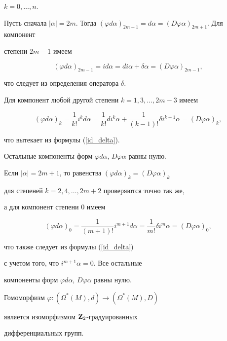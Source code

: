 $k=0,\dotsc,n$.





Пусть сначала $|\alpha|=2m$. Тогда $(\varphi d\alpha)_{2m+1}=


d\alpha=(D\varphi\alpha)_{2m+1}$. Для компонент


степени $2m-1$ имеем


$$


(\varphi d\alpha)_{2m-1}=id\alpha=di\alpha+\delta\alpha=


(D\varphi \alpha)_{2m-1},


$$


что следует из определения оператора $\delta$.





Для компонент любой другой степени $k=1,3,\dotsc,2m-3$ имеем


$$


(\varphi d\alpha)_k=\frac{1}{k!}i^k d\alpha=\frac{1}{k!}


di^k\alpha+\frac{1}{(k-1)!}\delta i^{k-1}\alpha=(D\varphi \alpha)_k,


$$


что вытекает из формулы (\ref{id_delta}).


Остальные компоненты форм $\varphi d\alpha$, $D\varphi\alpha$ равны нулю.





Если $|\alpha|=2m+1$, то равенства $(\varphi d\alpha)_k=(D\varphi\alpha)_k$


для степеней $k=2,4,\dotsc,2m+2$ проверяются точно так же,


а для компонент степени 0 имеем


$$


(\varphi d\alpha)_0=\frac1{(m+1)!}i^{m+1}d\alpha=\frac1{m!}\delta i^m\alpha=


(D\varphi\alpha)_0,


$$


что также следует из формулы (\ref{id_delta})


с учетом того, что $i^{m+1}\alpha=0$. Все остальные


компоненты форм $\varphi d\alpha$, $D\varphi\alpha$ равны нулю.








\begin{props}


Гомоморфизм $\varphi:(\Omega^*(M),d)\to (\Omega^*(M),D)$


является изоморфизмом $\bold Z_2$-градуированных


дифференциальных групп.


\end{props}





